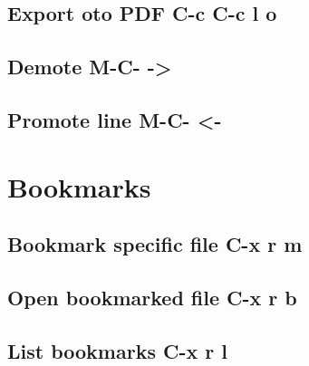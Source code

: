 \documentclass[11pt]{article}
\begin{document}
\subsection{Export oto PDF C-c C-c l o}
\label{sec:org9bf375a}

\subsection{Demote M-C- ->}
\label{sec:org3b10fdb}

\subsection{Promote line M-C- <-}
\label{sec:orgffd39f5}

\section{Bookmarks}
\label{sec:org15f4c06}

\subsection{Bookmark specific file C-x r m}
\label{sec:orgd60b76a}

\subsection{Open bookmarked file C-x r b}
\label{sec:orga598c4f}

\subsection{List bookmarks C-x r l}
\label{sec:org2338330}
\end{document}
